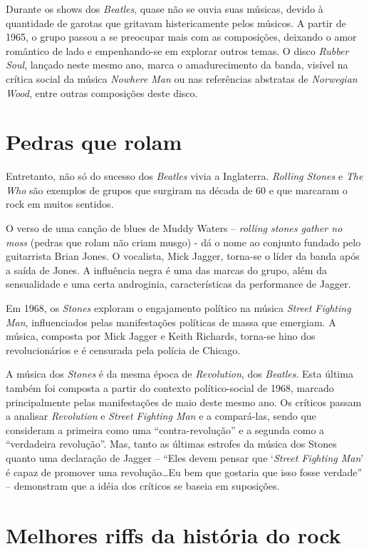 Durante os shows dos {\it Beatles}, quase não se ouvia suas músicas, devido à 
quantidade 
de garotas que gritavam 
histericamente pelos músicos. A partir de 1965, o grupo passou a se preocupar mais com as composições, 
deixando o amor romântico de lado e empenhando-se em explorar outros temas. O disco {\it Rubber Soul}, 
lançado 
neste mesmo ano, marca o amadurecimento da banda, visível na crítica social da música {\it Nowhere Man} ou 
nas 
referências abstratas de {\it Norwegian Wood}, entre outras composições deste disco.


\section{Pedras que rolam}

Entretanto, não só do sucesso dos {\it Beatles} vivia a Inglaterra. {\it Rolling Stones} e {\it The Who} 
são exemplos de 
grupos que surgiram na década de 60 e que marcaram o rock em muitos sentidos.

O verso de uma canção de blues de Muddy Waters – {\it rolling stones gather no moss} (pedras que rolam não 
criam 
musgo) - dá o nome ao conjunto fundado pelo guitarrista Brian Jones. O vocalista, Mick Jagger, torna-se o 
líder da banda após a saída de Jones. A influência negra é uma das marcas do grupo, além da sensualidade e 
uma certa androginia, características da performance de Jagger.

Em 1968, os {\it Stones} exploram o engajamento político na música {\it Street Fighting Man}, influenciados 
pelas 
manifestações políticas de massa que emergiam. A música, composta por Mick Jagger e Keith Richards, torna-se 
hino dos revolucionários e é censurada pela polícia de Chicago.

A música dos {\it Stones} é da mesma época de {\it Revolution}, dos {\it Beatles}. Esta última também foi 
composta a partir do 
contexto político-social de 1968, marcado principalmente pelas manifestações de maio deste mesmo ano. Os 
críticos passam a analisar {\it Revolution} e {\it Street Fighting Man} e a compará-las, sendo que 
consideram a primeira 
como uma “contra-revolução” e a segunda como a “verdadeira revolução”. Mas, tanto as últimas estrofes da 
música dos Stones quanto uma declaração de Jagger – “Eles devem pensar que ‘{\it Street Fighting Man}’ é 
capaz de 
promover uma revolução\ldots Eu bem que gostaria que isso fosse verdade” – demonstram que a idéia dos 
críticos se baseia em suposições.

\section{Melhores riffs da história do rock}

